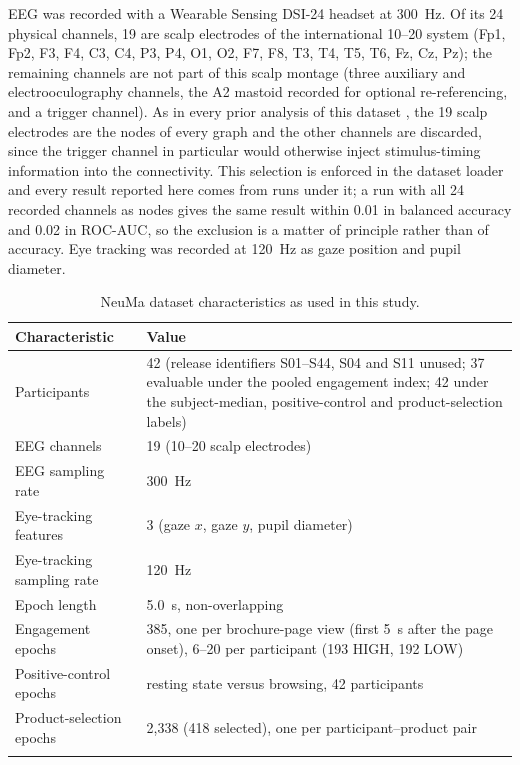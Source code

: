 EEG was recorded with a Wearable Sensing DSI-24 headset at 300~Hz. Of its 24 physical channels, 19 are scalp electrodes of the international 10--20 system (Fp1, Fp2, F3, F4, C3, C4, P3, P4, O1, O2, F7, F8, T3, T4, T5, T6, Fz, Cz, Pz); the remaining channels are not part of this scalp montage (three auxiliary and electrooculography channels, the A2 mastoid recorded for optional re-referencing, and a trigger channel). As in every prior analysis of this dataset \cite{ref18,ref36}, the 19 scalp electrodes are the nodes of every graph and the other channels are discarded, since the trigger channel in particular would otherwise inject stimulus-timing information into the connectivity. This selection is enforced in the dataset loader and every result reported here comes from runs under it; a run with all 24 recorded channels as nodes gives the same result within 0.01 in balanced accuracy and 0.02 in ROC-AUC, so the exclusion is a matter of principle rather than of accuracy. Eye tracking was recorded at 120~Hz as gaze position and pupil diameter.

\begin{table}[!htbp]
\caption{NeuMa dataset characteristics as used in this study.}\label{tab1}
\small
\begin{tabular*}{\linewidth}{@{\extracolsep{\fill}}lp{8.5cm}@{}}
\toprule
Characteristic & Value \\
\midrule
Participants & 42 (release identifiers S01--S44, S04 and S11 unused; 37 evaluable under the pooled engagement index; 42 under the subject-median, positive-control and product-selection labels) \\
EEG channels & 19 (10--20 scalp electrodes) \\
EEG sampling rate & 300~Hz \\
Eye-tracking features & 3 (gaze $x$, gaze $y$, pupil diameter) \\
Eye-tracking sampling rate & 120~Hz \\
Epoch length & 5.0~s, non-overlapping \\
Engagement epochs & 385, one per brochure-page view (first 5~s after the page onset), 6--20 per participant (193 HIGH, 192 LOW) \\
Positive-control epochs & resting state versus browsing, 42 participants \\
Product-selection epochs & 2{,}338 (418 selected), one per participant--product pair \\
\botrule
\end{tabular*}
\end{table}

